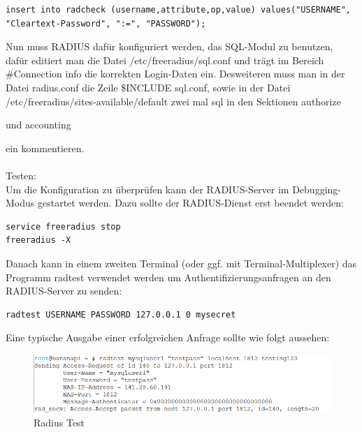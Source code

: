 \begin{lstlisting}
insert into radcheck (username,attribute,op,value) values("USERNAME", "Cleartext-Password", ":=", "PASSWORD");
\end{lstlisting}
Nun muss RADIUS dafür konfiguriert werden, das SQL-Modul zu benutzen, dafür editiert man die
Datei /etc/freeradius/sql.conf und trägt im Bereich \#Connection info die korrekten Login-Daten ein.
Desweiteren muss man in der Datei radius.conf die Zeile \$INCLUDE sql.conf, sowie in der Datei
/etc/freeradius/sites-available/default zwei mal sql in den Sektionen authorize { und accounting
{ ein kommentieren.\\
~\\
Testen:\\
Um die Konfiguration zu überprüfen kann der RADIUS-Server im Debugging-Modus gestartet
werden. Dazu sollte der RADIUS-Dienst erst beendet werden:
\begin{lstlisting}
service freeradius stop
freeradius -X
\end{lstlisting}
Danach kann in einem zweiten Terminal (oder ggf. mit Terminal-Multiplexer) das Programm radtest
verwendet werden um Authentifizierungsanfragen an den RADIUS-Server zu senden: \cite{rad6}
\begin{lstlisting}
radtest USERNAME PASSWORD 127.0.0.1 0 mysecret
\end{lstlisting}
Eine typische Ausgabe einer erfolgreichen Anfrage sollte wie folgt aussehen:
\begin{figure}[ht]                    
\includegraphics[width=\textwidth]{pictures/Tom/Radius2}
\caption{Radius Test}
\end{figure}
\newpage
}}
